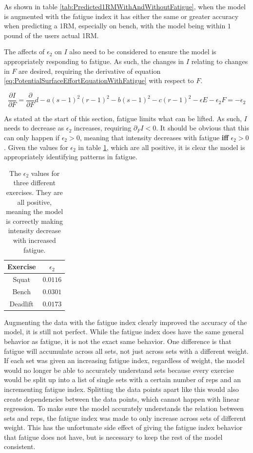 As shown in table \ref{tab:Predicted1RMWithAndWithoutFatigue}, when the model is augmented with the fatigue index it has either the same or greater accuracy when predicting a 1RM, especially on bench, with the model being within $1$ pound of the users actual 1RM.

The affects of $\epsilon_2$ on $I$ also need to be considered to ensure the model is appropriately responding to fatigue. As such, the changes in $I$ relating to changes in $F$ are desired, requiring the derivative of equation \ref{eq:PotentialSurfaceEffortEquationWithFatigue} with respect to $F$. 

\begin{equation}
    \label{eq:VolumeFPartialDerivative}
    \frac{\partial I}{\partial F}=\frac{\partial}{\partial F} d-a(s-1)^2(r-1)^2-b(s-1)^2-c(r-1)^2-\epsilon E-\epsilon_2 F=-\epsilon_2
\end{equation}

As stated at the start of this section, fatigue limits what can be lifted. As such, $I$ needs to decrease as $\epsilon_2$ increases, requiring $\partial_F I<0$. It should be obvious that this can only happen if $\epsilon_2>0$, meaning that intensity decreases with fatigue \textbf{iff} $\epsilon_2>0$. Given the values for $\epsilon_2$ in table \ref{tab:Epsilon2AcrossExercises}, which are all positive, it is clear the model is appropriately identifying patterns in fatigue.

\begin{table}[h]
    \centering
    \begin{tabular}{c|c}
        Exercise & $\epsilon_2$ \\
        \hline
        Squat & $0.0116$ \\
        Bench & $0.0301$ \\
        Deadlift & $0.0173$ \\
    \end{tabular}
    \caption{The $\epsilon_2$ values for three different exercises. They are all positive, meaning the model is correctly making intensity decrease with increased fatigue.}
    \label{tab:Epsilon2AcrossExercises}
\end{table}

Augmenting the data with the fatigue index clearly improved the accuracy of the model, it is still not perfect. While the fatigue index does have the same general behavior as fatigue, it is not the exact same behavior. One difference is that fatigue will accumulate across all sets, not just across sets with a different weight. If each set was given an increasing fatigue index, regardless of weight, the model would no longer be able to accurately understand sets because every exercise would be split up into a list of single sets with a certain number of reps and an incrementing fatigue index. Splitting the data points apart like this would also create dependencies between the data points, which cannot happen with linear regression. To make sure the model accurately understands the relation between sets and reps, the fatigue index was made to only increase across sets of different weight. This has the unfortunate side effect of giving the fatigue index behavior that fatigue does not have, but is necessary to keep the rest of the model consistent.

